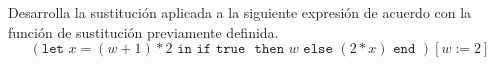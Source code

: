    \begin{exercise}
        Desarrolla la sustitución aplicada a la siguiente expresión de acuerdo con la función de sustitución previamente definida.
        	\[
          	  (\texttt{let } x = (w + 1) * 2 \texttt{ in} \texttt{ if } \texttt{true } \texttt{ then } w \texttt{ else } (2 * x) \texttt{ end })[w:=2]
        	\]


\end{exercise}
